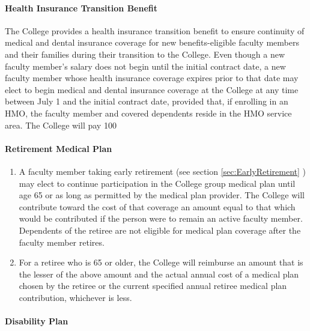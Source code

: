 			\paragraph{Health Insurance Transition Benefit}
				The College provides a health insurance transition benefit to ensure continuity of medical and dental insurance coverage for new benefits-eligible faculty members and their families during their transition to the College.  Even though a new faculty member's salary does not begin until the initial contract date, a new faculty member whose health insurance coverage expires prior to that date may elect to begin medical and dental insurance coverage at the College at any time between July 1 and the initial contract date, provided that, if enrolling in an HMO, the faculty member and covered dependents reside in the HMO service area.  The College will pay 100%
			\paragraph{Retirement Medical Plan}
				\begin{enumerate}[label=\alph*)]
					\item{A faculty member taking early retirement (see
						section
						\ref{sec:EarlyRetirement}
						) may elect to continue participation in the College group medical plan until age 65 or as long as permitted by the medical plan provider.  The College will contribute toward the cost of that coverage an amount equal to that which would be contributed if the person were to remain an active faculty member.  Dependents of the retiree are not eligible for medical plan coverage after the faculty member retires.}
					\item{For a retiree who is 65 or older, the College will reimburse an amount that is the lesser of the above amount and the actual annual cost of a medical plan chosen by the retiree or the current specified annual retiree medical plan contribution, whichever is less.}
				\end{enumerate}


			\paragraph{Disability Plan}

